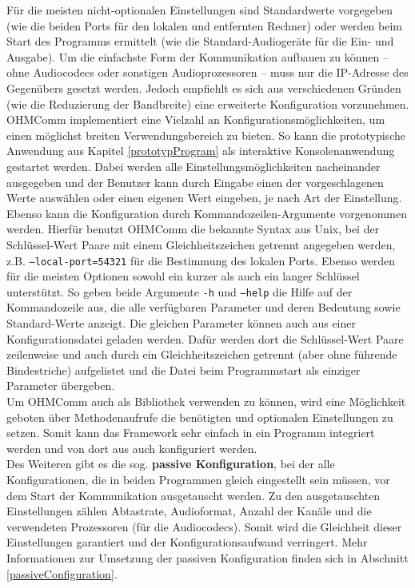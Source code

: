Für die meisten nicht-optionalen Einstellungen sind Standardwerte vorgegeben (wie die beiden Ports für den lokalen und entfernten Rechner) oder werden beim Start des Programms ermittelt (wie die Standard-Audiogeräte für die Ein- und Ausgabe). Um die einfachste Form der Kommunikation aufbauen zu können -- ohne Audiocodecs oder sonstigen Audioprozessoren -- muss nur die IP-Adresse des Gegenübers gesetzt werden. Jedoch empfiehlt es sich aus verschiedenen Gründen (wie die Reduzierung der Bandbreite) eine erweiterte Konfiguration vorzunehmen.
\\
OHMComm implementiert eine Vielzahl an Konfigurationsmöglichkeiten, um einen möglichst breiten Verwendungsbereich zu bieten. So kann die prototypische Anwendung aus Kapitel \ref{prototypProgram} als interaktive Konsolenanwendung gestartet werden. Dabei werden alle Einstellungsmöglichkeiten nacheinander ausgegeben und der Benutzer kann durch Eingabe einen der vorgeschlagenen Werte auswählen oder einen eigenen Wert eingeben, je nach Art der Einstellung.
\\
Ebenso kann die Konfiguration durch Kommandozeilen-Argumente vorgenommen werden. Hierfür benutzt OHMComm die bekannte Syntax aus Unix, bei der Schlüssel-Wert Paare mit einem Gleichheitszeichen getrennt angegeben werden, z.B. \texttt{--local-port=54321} für die Bestimmung des lokalen Ports. Ebenso werden für die meisten Optionen sowohl ein kurzer als auch ein langer Schlüssel unterstützt. So geben beide Argumente \texttt{-h} und \texttt{--help} die Hilfe auf der Kommandozeile aus, die alle verfügbaren Parameter und deren Bedeutung sowie Standard-Werte anzeigt. Die gleichen Parameter können auch aus einer Konfigurationsdatei geladen werden. Dafür werden dort die Schlüssel-Wert Paare zeilenweise und auch durch ein Gleichheitszeichen getrennt (aber ohne führende Bindestriche) aufgelistet und die Datei beim Programmstart als einziger Parameter übergeben.
\\
Um OHMComm auch als Bibliothek verwenden zu können, wird eine Möglichkeit geboten über Methodenaufrufe die benötigten und optionalen Einstellungen zu setzen. Somit kann das Framework sehr einfach in ein Programm integriert werden und von dort  aus auch konfiguriert werden.
\\
Des Weiteren gibt es die sog. \textbf{passive Konfiguration}, bei der alle Konfigurationen, die in beiden Programmen gleich eingestellt sein müssen, vor dem Start der Kommunikation ausgetauscht werden. Zu den ausgetauschten Einstellungen zählen Abtastrate, Audioformat, Anzahl der Kanäle und die verwendeten Prozessoren (für die Audiocodecs). Somit wird die Gleichheit dieser Einstellungen garantiert und der Konfigurationsaufwand verringert. Mehr Informationen zur Umsetzung der passiven Konfiguration finden sich in Abschnitt \ref{passiveConfiguration}.

